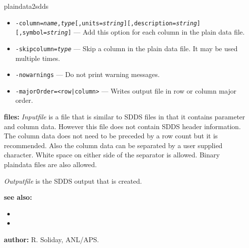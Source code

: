 \begin{sddsprog}{plaindata2sdds}
\begin{itemize}
      \item {\tt -column={\em name},{\em type}[,units={\em string}][,description={\em string}][,symbol={\em string}]} --- Add this option for each column in the plain data file.
      \item {\tt -skipcolumn={\em type}} --- Skip a column in the plain data file. It may be used multiple times.
      \item {\tt -nowarnings} --- Do not print warning messages.
      \item {\tt -majorOrder=<row|column>} --- Writes output file in row or column major order.
    \end{itemize}
  \item \textbf{files:}
    {\em Inputfile} is a file that is similar to SDDS files in that it contains parameter and column data. However this file does not contain SDDS header information. The column data does not need to be preceded by a row count but it is recommended. Also the column data can be separated by a user supplied character. White space on either side of the separator is allowed. Binary plaindata files are also allowed.

    {\em Outputfile} is the SDDS output that is created.
  \item \textbf{see also:}
    \begin{itemize}
      \item {}
      \item {}
    \end{itemize}
  \item \textbf{author:} R. Soliday, ANL/APS.
\end{sddsprog}
